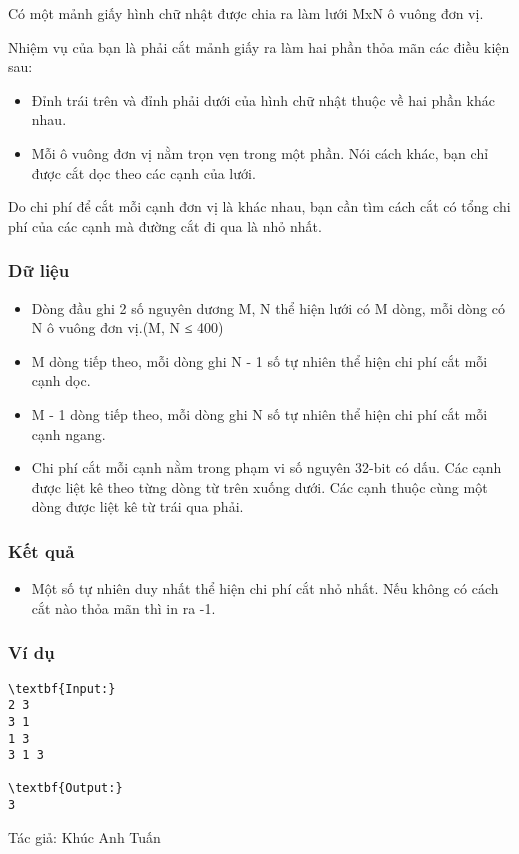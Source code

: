

Có một mảnh giấy hình chữ nhật được chia ra làm lưới MxN ô vuông đơn vị.

Nhiệm vụ của bạn là phải cắt mảnh giấy ra làm hai phần thỏa mãn các điều kiện sau:
\begin{itemize}
	\item Đỉnh trái trên và đỉnh phải dưới của hình chữ nhật thuộc về hai phần khác nhau.
	\item Mỗi ô vuông đơn vị nằm trọn vẹn trong một phần. Nói cách khác, bạn chỉ được cắt dọc theo các cạnh của lưới.
\end{itemize}

Do chi phí để cắt mỗi cạnh đơn vị là khác nhau, bạn cần tìm cách cắt có tổng chi phí của các cạnh mà đường cắt đi qua là nhỏ nhất.

\subsubsection{Dữ liệu}
\begin{itemize}
	\item Dòng đầu ghi 2 số nguyên dương M, N thể hiện lưới có M dòng, mỗi dòng có N ô vuông đơn vị.(M, N ≤ 400)
	\item M dòng tiếp theo, mỗi dòng ghi N - 1 số tự nhiên thể hiện chi phí cắt mỗi cạnh dọc.
	\item M - 1 dòng tiếp theo, mỗi dòng ghi N số tự nhiên thể hiện chi phí cắt mỗi cạnh ngang.
	\item Chi phí cắt mỗi cạnh nằm trong phạm vi số nguyên 32-bit có dấu. Các cạnh được liệt kê theo từng dòng từ trên xuống dưới. Các cạnh thuộc cùng một dòng được liệt kê từ trái qua phải.
\end{itemize}

\subsubsection{Kết quả}
\begin{itemize}
	\item Một số tự nhiên duy nhất thể hiện chi phí cắt nhỏ nhất. Nếu không có cách cắt nào thỏa mãn thì in ra -1.
\end{itemize}

\subsubsection{Ví dụ}
\begin{verbatim}
\textbf{Input:}
2 3
3 1
1 3
3 1 3

\textbf{Output:}
3
\end{verbatim}

Tác giả: Khúc Anh Tuấn
